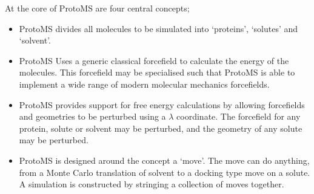 \documentclass[letterpaper,10pt,english]{sphinxmanual}
\begin{document}
At the core of ProtoMS are four central concepts;
\begin{itemize}
\item {} 
 ProtoMS divides all molecules to be simulated into ‘proteins’, ‘solutes’ and ‘solvent’.

\item {} 
 ProtoMS Uses a generic classical forcefield to calculate the energy of the molecules. This forcefield may be specialised such that ProtoMS is able to implement a wide range of modern molecular mechanics forcefields.

\item {} 
 ProtoMS provides support for free energy calculations by allowing forcefields and geometries to be perturbed using a \(\lambda\) coordinate. The forcefield for any protein, solute or solvent may be perturbed, and the geometry of any solute may be perturbed.

\item {} 
 ProtoMS is designed around the concept a ‘move’. The move can do anything, from a Monte Carlo translation of solvent to a docking type move on a solute. A simulation is constructed by stringing a collection of moves together.

\end{itemize}
\end{document}

